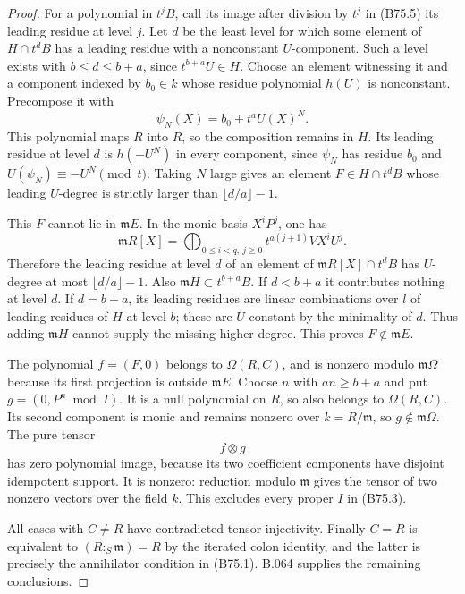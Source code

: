 \begin{proof}
For a polynomial in $t^jB$, call its image after division by $t^j$
in (B75.5) its leading residue at level $j$.
Let $d$ be the least level for which some element of $H\cap t^dB$
has a leading residue with a nonconstant $U$-component. Such a level
exists with $b\le d\le b+a$, since $t^{b+a}U\in H$.
Choose an element witnessing it and a component indexed by
$b_0\in k$ whose residue polynomial $h(U)$ is nonconstant.
Precompose it with
\[
                    \psi_N(X)=b_0+t^aU(X)^N.
\]
This polynomial maps $R$ into $R$, so the composition remains in $H$.
Its leading residue at level $d$ is $h(-U^N)$ in every component,
since $\psi_N$ has residue $b_0$ and
$U(\psi_N)\equiv-U^N\pmod t$.
Taking $N$ large gives an element $F\in H\cap t^dB$ whose leading
$U$-degree is strictly larger than $\lfloor d/a\rfloor-1$.

This $F$ cannot lie in $\mathfrak mE$.
In the monic basis $X^iP^j$, one has
\[
 \mathfrak mR[X]=
       \bigoplus_{0\le i<q,\ j\ge0}t^{a(j+1)}VX^iU^j.
\]
Therefore the leading residue at level $d$ of an element of
$\mathfrak mR[X]\cap t^dB$ has $U$-degree at most
$\lfloor d/a\rfloor-1$.
Also $\mathfrak mH\subset t^{b+a}B$. If $d<b+a$ it contributes
nothing at level $d$. If $d=b+a$, its leading residues are linear
combinations over $l$ of leading residues of $H$ at level $b$;
these are $U$-constant by the minimality of $d$.
Thus adding $\mathfrak mH$ cannot supply the missing higher degree.
This proves $F\notin\mathfrak mE$.

The polynomial $f=(F,0)$ belongs to $\Omega(R,C)$, and is nonzero
modulo $\mathfrak m\Omega$ because its first projection is outside
$\mathfrak mE$. Choose $n$ with $an\ge b+a$ and put
$g=(0,P^n\bmod I)$. It is a null polynomial on $R$, so also belongs
to $\Omega(R,C)$. Its second component is monic and remains nonzero
over $k=R/\mathfrak m$, so $g\notin\mathfrak m\Omega$.
The pure tensor
\[
                              f\otimes g                  \tag{B75.9}
\]
has zero polynomial image, because its two coefficient components
have disjoint idempotent support. It is nonzero: reduction modulo
$\mathfrak m$ gives the tensor of two nonzero vectors over the field
$k$. This excludes every proper $I$ in (B75.3).

All cases with $C\ne R$ have contradicted tensor injectivity.
Finally $C=R$ is equivalent to $(R:_S\mathfrak m)=R$ by the iterated
colon identity, and the latter is precisely the annihilator condition
in (B75.1). B.064 supplies the remaining conclusions.
\end{proof}
